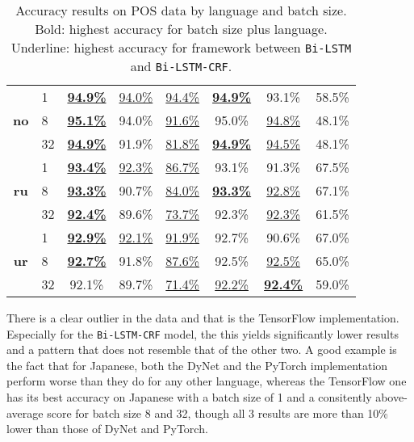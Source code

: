 \begin{table}[h]
\begin{tabular}{c l c c c|c c c}
        \cmidrule(lr){1-8}
        \multirow{3}{*}{\bfseries no}
        &  1 & \underline{\textbf{94.9\%}} & \underline{94.0\%} & \underline{94.4\%} & \underline{\textbf{94.9\%}} & 93.1\% & 58.5\% \\
        &  8 & \underline{\textbf{95.1\%}} & 94.0\% & \underline{91.6\%} & 95.0\% & \underline{94.8\%} & 48.1\% \\
        & 32 & \underline{\textbf{94.9\%}} & 91.9\% & \underline{81.8\%} & \underline{\textbf{94.9\%}} & \underline{94.5\%} & 48.1\% \\

        \cmidrule(lr){1-8}
        \multirow{3}{*}{\bfseries ru}
        &  1 & \underline{\textbf{93.4\%}} & \underline{92.3\%} & \underline{86.7\%} & 93.1\% & 91.3\% & 67.5\% \\
        &  8 & \underline{\textbf{93.3\%}} & 90.7\% & \underline{84.0\%} & \underline{\textbf{93.3\%}} & \underline{92.8\%} & 67.1\% \\
        & 32 & \underline{\textbf{92.4\%}} & 89.6\% & \underline{73.7\%} & 92.3\% & \underline{92.3\%} & 61.5\% \\

        \cmidrule(lr){1-8}
        \multirow{3}{*}{\bfseries ur}
        &  1 & \underline{\textbf{92.9\%}} & \underline{92.1\%} & \underline{91.9\%} & 92.7\% & 90.6\% & 67.0\% \\
        &  8 & \underline{\textbf{92.7\%}} & 91.8\% & \underline{87.6\%} & 92.5\% & \underline{92.5\%} & 65.0\% \\
        & 32 & 92.1\% & 89.7\% & \underline{71.4\%} & \underline{92.2\%} & \underline{\textbf{92.4\%}} & 59.0\% \\
        \bottomrule
    \end{tabular}
    \caption{%
      Accuracy results on POS data by language and batch size.
      Bold: highest accuracy for batch size plus language.
      Underline: highest accuracy for framework between
      \texttt{Bi-LSTM} and \texttt{Bi-LSTM-CRF}.
    }\label{table:acc-total-pos}
\end{table}


There is a clear outlier in the data and that is the TensorFlow implementation.
Especially for the \texttt{Bi-LSTM-CRF} model, the this yields significantly
lower results and a pattern that does not resemble that of the other two. A good
example is the fact that for Japanese, both the DyNet and the PyTorch
implementation perform worse than they do for any other language, whereas the
TensorFlow one has its best accuracy on Japanese with a batch size of 1 and  a
consitently above-average score for batch size 8 and 32, though all 3 results
are more than 10\% lower than those of DyNet and PyTorch.

